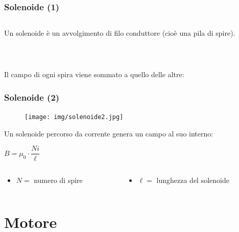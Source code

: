 \documentclass[]{beamer}
\theoremstyle{plain}
\begin{document}
\begin{frame}
\frametitle{Solenoide (1)}
\begin{columns}
\begin{column}{0.6\textwidth}
Un solenoide è un avvolgimento di filo conduttore (cioè una pila di spire).
\end{column}
\begin{column}{0.3\textwidth}
\end{column}
\end{columns}\pause

~

Il campo di ogni spira viene sommato a quello delle altre:
\end{frame}





\begin{frame}
\frametitle{Solenoide (2)}
\begin{figure}
\texttt{[image: img/solenoide2.jpg]}
\end{figure}

Un solenoide percorso da corrente genera un campo al suo interno:
\begin{center}
\colorbox{blue!30}{$ B = \mu_0 \cdot \dfrac{Ni}{\ell} $}
\end{center}
\begin{columns}
\begin{column}{0.4\textwidth}
\begin{itemize}
  \item $ N= $ numero di spire
\end{itemize}
\end{column}
\begin{column}{0.5\textwidth}
\begin{itemize}
  \item $ \ell = $ lunghezza del solenoide
\end{itemize}
\end{column}
\end{columns}
\end{frame}


\section{Motore}
\end{document}
